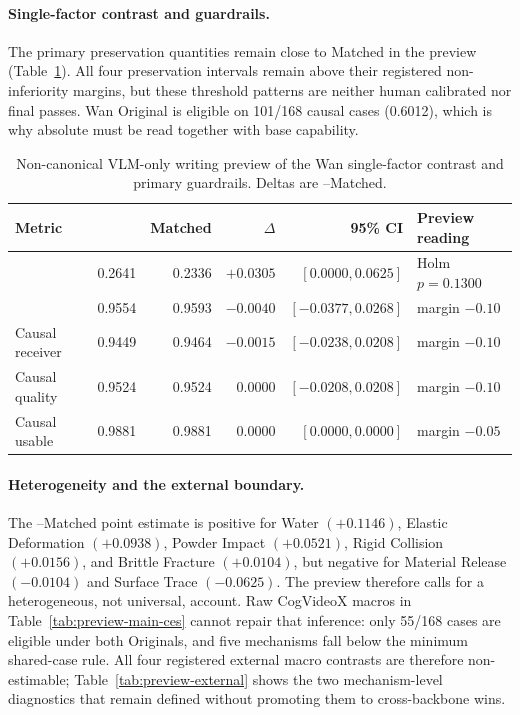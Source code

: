 {\paragraph{Single-factor contrast and guardrails.}
The primary preservation quantities remain close to Matched in the preview
(Table~\ref{tab:preview-wan-guardrails}).  All four preservation intervals
remain above their registered non-inferiority margins, but these threshold
patterns are neither human calibrated nor final passes.  Wan Original is
eligible on 101/168 causal cases (0.6012), which is why absolute \ces{} must be
read together with base capability.

\begin{table}[H]
  \centering
  \caption{Non-canonical VLM-only writing preview of the Wan single-factor
  contrast and primary guardrails. Deltas are \methodshort{}--Matched.}
  \label{tab:preview-wan-guardrails}
  \small
  \setlength{\tabcolsep}{5pt}
  \begin{tabular}{lrrrrl}
    \toprule
    Metric & \methodshort{} & Matched & \(\Delta\) & 95\% CI & Preview reading \\
    \midrule
    \ces{} & 0.2641 & 0.2336 & \(+0.0305\) & \([0.0000,0.0625]\) & Holm \(p=0.1300\) \\
    \su{} & 0.9554 & 0.9593 & \(-0.0040\) & \([-0.0377,0.0268]\) & margin \(-0.10\) \\
    Causal receiver & 0.9449 & 0.9464 & \(-0.0015\) & \([-0.0238,0.0208]\) & margin \(-0.10\) \\
    Causal quality & 0.9524 & 0.9524 & \(0.0000\) & \([-0.0208,0.0208]\) & margin \(-0.10\) \\
    Causal usable & 0.9881 & 0.9881 & \(0.0000\) & \([0.0000,0.0000]\) & margin \(-0.05\) \\
    \bottomrule
  \end{tabular}
\end{table}

\paragraph{Heterogeneity and the external boundary.}
The \methodshort{}--Matched point estimate is positive for Water
\(\left(+0.1146\right)\), Elastic Deformation \(\left(+0.0938\right)\),
Powder Impact \(\left(+0.0521\right)\), Rigid Collision
\(\left(+0.0156\right)\), and Brittle Fracture \(\left(+0.0104\right)\), but
negative for Material Release \(\left(-0.0104\right)\) and Surface Trace
\(\left(-0.0625\right)\).  The preview therefore calls for a heterogeneous, not
universal, account.  Raw CogVideoX macros in
Table~\ref{tab:preview-main-ces} cannot repair that inference: only 55/168
cases are eligible under both Originals, and five mechanisms fall below the
minimum shared-case rule.  All four registered external macro contrasts are
therefore non-estimable; Table~\ref{tab:preview-external} shows the two
mechanism-level diagnostics that remain defined without promoting them to
cross-backbone wins.

}
